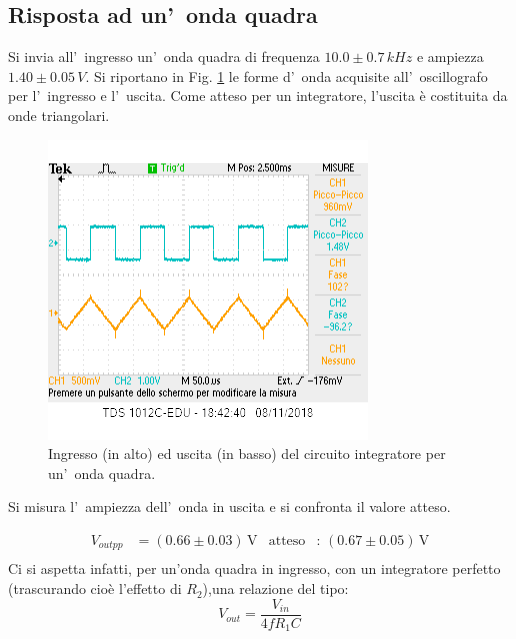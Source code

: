 \documentclass[10pt,a4paper]{article}
\begin{document}
	\subsection{Risposta ad un'~onda quadra}
	Si invia all'~ingresso un'~onda quadra di frequenza $ 10.0\pm0.7 \,kHz$ e ampiezza $ 1.40\pm 0.05\,V$.
	Si riportano in Fig. \ref{fig:oscinte} le forme d'~onda acquisite all'~oscillografo per l'~ingresso
	e l'~uscita. 
	Come atteso per un integratore, l'uscita è costituita da onde triangolari.
	\begin{figure}[htb]
		\begin{center}

			\includegraphics[scale=0.8]{zanna.png}


\caption{\small Ingresso (in alto) ed uscita (in basso) del circuito integratore per un'~onda quadra.}
		\label{fig:oscinte}
		\end{center}
		
	\end{figure}
	
	Si misura l'~ampiezza dell'~onda  in uscita e si confronta il valore atteso.
	
	\begin{align*}
	V_{out pp} &= (0.66\pm 0.03 )\,\mathrm{V} & \mathrm{atteso} &:\,(0.67\pm 0.05 )\, \mathrm{V}  \\
	\end{align*}
 	Ci si aspetta infatti, per un'onda quadra in ingresso, con un integratore perfetto (trascurando cioè l'effetto di $R_2$),una relazione del tipo: \[V_{out}=\frac{V_{in}}{4fR_{1}C}\]
	
	
\end{document}
